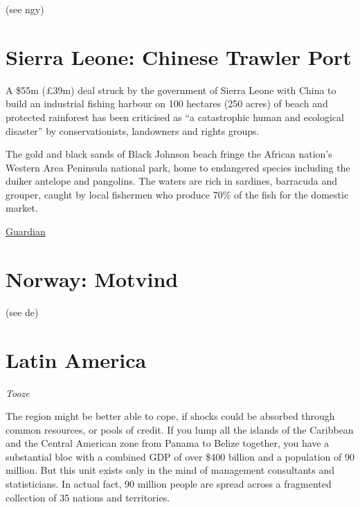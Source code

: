 \documentclass[
]{book}
\begin{document}
(see ngy)

\hypertarget{sierra-leone-chinese-trawler-port}{%
\section{Sierra Leone: Chinese Trawler Port}\label{sierra-leone-chinese-trawler-port}}

A \$55m (£39m) deal struck by the government of Sierra Leone with China to build an industrial fishing harbour on 100 hectares (250 acres) of beach and protected rainforest has been criticised as ``a catastrophic human and ecological disaster'' by conservationists, landowners and rights groups.

The gold and black sands of Black Johnson beach fringe the African nation's Western Area Peninsula national park, home to endangered species including the duiker antelope and pangolins. The waters are rich in sardines, barracuda and grouper, caught by local fishermen who produce 70\% of the fish for the domestic market.

\href{https://www.theguardian.com/environment/2021/may/17/sierra-leone-sells-rainforest-for-chinese-fishmeal-plant}{Guardian}

\hypertarget{norway-motvind}{%
\section{Norway: Motvind}\label{norway-motvind}}

(see de)

\hypertarget{latin-america}{%
\section{Latin America}\label{latin-america}}

\emph{Tooze}

The region might be better able to cope, if shocks could be absorbed through common resources, or pools of credit. If you lump all the islands of the Caribbean and the Central American zone from Panama to Belize together, you have a substantial bloc with a combined GDP of over \$400 billion and a population of 90 million. But this unit exists only in the mind of management consultants and statisticians. In actual fact, 90 million people are spread across a fragmented collection of 35 nations and territories.
\end{document}
